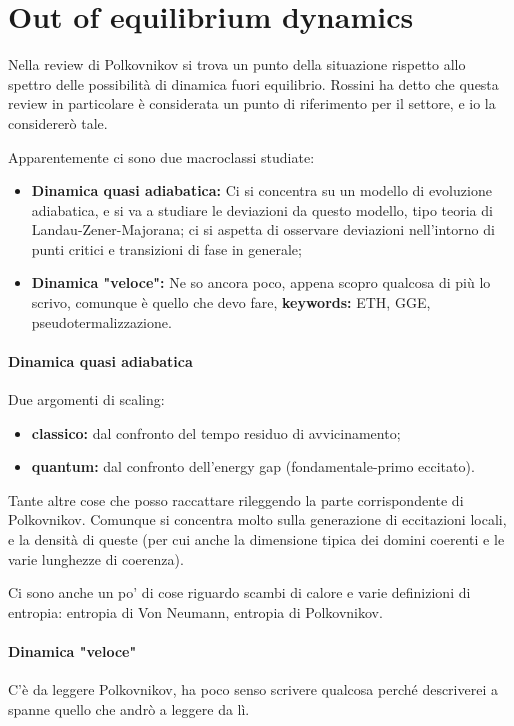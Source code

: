 \documentclass[a4paper,10pt]{article}
\begin{document}
\section{Out of equilibrium dynamics}
Nella review di Polkovnikov si trova un punto della situazione rispetto allo spettro delle possibilità di dinamica fuori equilibrio. Rossini ha detto che questa review in particolare è considerata un punto di riferimento per il settore, e io la considererò tale.

Apparentemente ci sono due macroclassi studiate:
\begin{itemize}
	\item \textbf{Dinamica quasi adiabatica:} Ci si concentra su un  modello di evoluzione adiabatica, e si va a studiare le deviazioni da questo modello, tipo teoria di Landau-Zener-Majorana; ci si aspetta di osservare deviazioni nell'intorno di punti critici e transizioni di fase in generale;
	\item \textbf{Dinamica "veloce":} Ne so ancora poco, appena scopro qualcosa di più lo scrivo, comunque è quello che devo fare, \textbf{keywords:} ETH, GGE, pseudotermalizzazione.	
\end{itemize}

\paragraph{Dinamica quasi adiabatica}
Due argomenti di scaling:
\begin{itemize}
	\item \textbf{classico:} dal confronto del tempo residuo di avvicinamento;
	\item \textbf{quantum:} dal confronto dell'energy gap (fondamentale-primo eccitato).
\end{itemize}

Tante altre cose che posso raccattare rileggendo la parte corrispondente di Polkovnikov.
Comunque si concentra molto sulla generazione di eccitazioni locali, e la densità di queste (per cui anche la dimensione tipica dei domini coerenti e le varie lunghezze di coerenza).

Ci sono anche un po' di cose riguardo scambi di calore e varie definizioni di entropia: entropia di Von Neumann, entropia di Polkovnikov.

\paragraph{Dinamica "veloce"} C'è da leggere Polkovnikov, ha poco senso scrivere qualcosa perché descriverei a spanne quello che andrò a leggere da lì.
\end{document}
